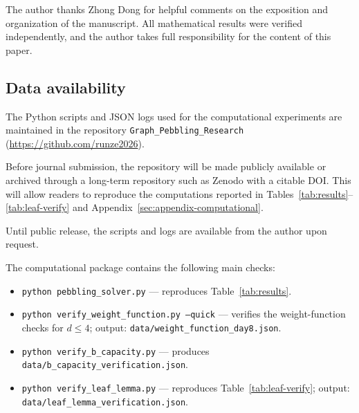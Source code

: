 The author thanks Zhong Dong for helpful comments on the exposition and
organization of the manuscript. All mathematical results were verified
independently, and the author takes full responsibility for the content of
this paper.


\subsection*{Data availability}\label{sec:data-availability}

\begin{sloppypar}

The Python scripts and JSON logs used for the computational experiments are
maintained in the repository
\texttt{Graph\_Pebbling\_Research}
(\url{https://github.com/runze2026}).

Before journal submission, the repository will be made publicly available
or archived through a long-term repository such as Zenodo with a citable
DOI. This will allow readers to reproduce the computations reported in
Tables~\ref{tab:results}--\ref{tab:leaf-verify} and
Appendix~\ref{sec:appendix-computational}.

Until public release, the scripts and logs are available from the author
upon request.

The computational package contains the following main checks:

\end{sloppypar}


\begin{itemize}

\item
\texttt{python pebbling\_solver.py}
--- reproduces Table~\ref{tab:results}.

\item
\texttt{python verify\_weight\_function.py --quick}
--- verifies the weight-function checks for $d\le4$;
output:
\texttt{data/weight\_function\_day8.json}.

\item
\texttt{python verify\_b\_capacity.py}
--- produces
\texttt{data/b\_capacity\_verification.json}.

\item
\texttt{python verify\_leaf\_lemma.py}
--- reproduces Table~\ref{tab:leaf-verify};
output:
\texttt{data/leaf\_lemma\_verification.json}.

\end{itemize}